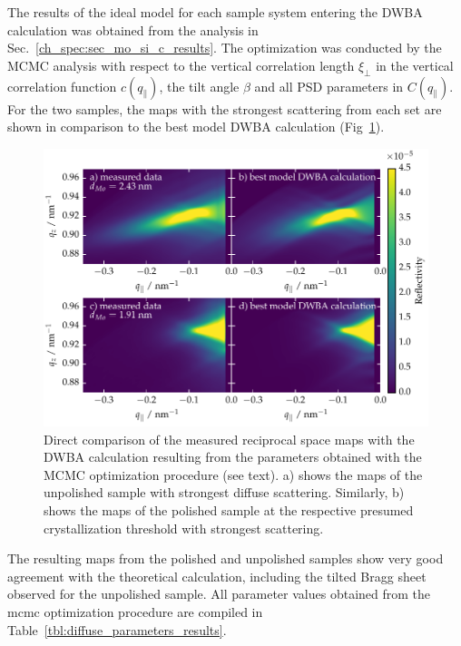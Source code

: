 The results of the ideal model for each sample system entering the DWBA calculation was obtained from the analysis in Sec.~\ref{ch_spec:sec_mo_si_c_results}. The optimization was conducted by the MCMC analysis with respect to the vertical correlation length $\xi_\perp$ in the vertical correlation function $c(q_\parallel)$, the tilt angle $\beta$ and all PSD parameters in $C(q_\parallel)$. For the two samples, the maps with the strongest scattering from each set are shown in comparison to the best model DWBA calculation (Fig~\ref{fig:dwba_data_best_model_comparison}). 
\begin{figure}[htbp]
\centering
\includegraphics[width=\textwidth]{img/MoSiC_dwba_data_best_model_comparison}
\caption{Direct comparison of the measured reciprocal space maps with the DWBA calculation resulting from the parameters obtained with the MCMC optimization procedure (see text). a) shows the maps of the unpolished sample with strongest diffuse scattering. Similarly, b) shows the maps of the polished sample at the respective presumed crystallization threshold with strongest scattering.}
\label{fig:dwba_data_best_model_comparison}
\end{figure}
The resulting maps from the polished and unpolished samples show very good agreement with the theoretical calculation, including the tilted Bragg sheet observed for the unpolished sample. All parameter values obtained from the \gls{mcmc} optimization procedure are compiled in Table~\ref{tbl:diffuse_parameters_results}. 

